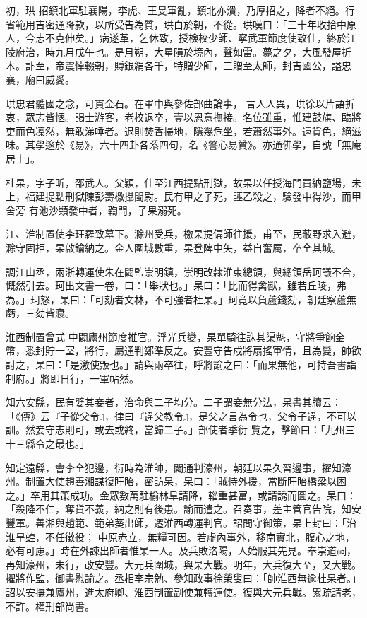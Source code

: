 \begin{pinyinscope}
 初，珙
 招鎮北軍駐襄陽，李虎、王旻軍亂，鎮北亦潰，乃厚招之，降者不絕。行省範用吉密通降款，以所受告為質，珙白於朝，不從。珙嘆曰：「三十年收拾中原人，今志不克伸矣。」病遂革，乞休致，授檢校少師、寧武軍節度使致仕，終於江陵府治，時九月戊午也。是月朔，大星隕於境內，聲如雷。薨之夕，大風發屋折木。訃至，帝震悼輟朝，賻銀絹各千，特贈少師，三贈至太師，封吉國公，謚忠襄，廟曰威愛。



 珙忠君體國之念，可貫金石。在軍中與參佐部曲論事，
 言人人異，珙徐以片語折衷，眾志皆愜。謁士游客，老校退卒，壹以恩意撫接。名位雖重，惟建鼓旗、臨將吏而色凜然，無敢涕唾者。退則焚香掃地，隱幾危坐，若蕭然事外。遠貨色，絕滋味。其學邃於《易》，六十四卦各系四句，名《警心易贊》。亦通佛學，自號「無庵居士」。



 杜杲，字子昕，邵武人。父穎，仕至江西提點刑獄，故杲以任授海門買納鹽場，未上，福建提點刑獄陳彭壽檄攝閩尉。民有甲之子死，誣乙殺之，驗發中得沙，而甲舍旁
 有池沙類發中者，鞫問，子果溺死。



 江、淮制置使李玨羅致幕下。滁州受兵，檄杲提偏師往援，甫至，民蔽野求入避，滁守固拒，杲啟鑰納之。金人圍城數重，杲登陴中矢，益自奮厲，卒全其城。



 調江山丞，兩浙轉運使朱在闢監崇明鎮，崇明改隸淮東總領，與總領岳珂議不合，慨然引去。珂出文書一卷，曰：「舉狀也。」杲曰：「比而得禽獸，雖若丘陵，弗為。」珂怒，杲曰：「可劾者文林，不可強者杜杲。」珂竟以負蘆錢劾，朝廷察蘆無虧，三劾皆寢。



 淮西制置曾式
 中闢廬州節度推官。浮光兵變，杲單騎往誅其渠魁，守將爭餉金幣，悉封貯一室，將行，屬通判鄭準反之。安豐守告戍將扇搖軍情，且為變，帥欲討之，杲曰：「是激使叛也。」請與兩卒往，呼將諭之曰：「而果無他，可持吾書詣制府。」將即日行，一軍帖然。



 知六安縣，民有嬖其妾者，治命與二子均分。二子謂妾無分法，杲書其牘云：「《傳》云『子從父令』，律曰『違父教令』，是父之言為令也，父令子違，不可以訓。然妾守志則可，或去或終，當歸二子。」部使者季衍
 覽之，擊節曰：「九州三十三縣令之最也。」



 知定遠縣，會李全犯邊，衍時為淮帥，闢通判濠州，朝廷以杲久習邊事，擢知濠州。制置大使趙善湘謀復盱眙，密訪杲，杲曰：「賊恃外援，當斷盱眙橋梁以困之。」卒用其策成功。金眾數萬駐榆林阜請降，輜重甚富，或請誘而圖之。杲曰：「殺降不仁，奪貨不義，納之則有後患。諭而遣之。召奏事，差主管官告院，知安豐軍。善湘與趙範、範弟葵出師，遷淮西轉運判官。詔問守御策，杲上封曰：「沿淮旱蝗，不任徵役；
 中原赤立，無糧可因。若虛內事外，移南實北，腹心之地，必有可慮。」時在外諫出師者惟杲一人。及兵敗洛陽，人始服其先見。奉崇道祠，再知濠州，未行，改安豐。大元兵圍城，與杲大戰。明年，大兵復大至，又大戰。擢將作監，御書慰諭之。丞相李宗勉、參知政事徐榮叟曰：「帥淮西無逾杜杲者。」詔以安撫兼廬州，進太府卿、淮西制置副使兼轉運使。復與大元兵戰。累疏請老，不許。權刑部尚書。




\end{pinyinscope}
